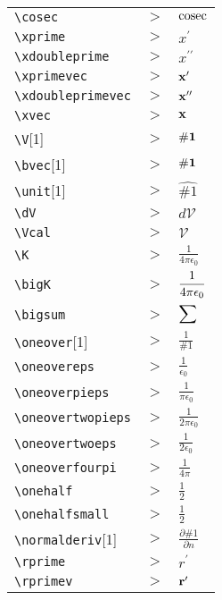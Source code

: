 
\begin{tabular}{l l l }
\verb|\cosec| &$\gt$& ${\hbox{cosec}}$\\[5pt] 
\verb|\xprime| &$\gt$& ${x^\prime}$\\[5pt] 
\verb|\xdoubleprime| &$\gt$& ${x^{\prime\prime}}$\\[5pt] 
\verb|\xprimevec| &$\gt$& ${{\bf{x}^\prime}}$\\[5pt] 
\verb|\xdoubleprimevec| &$\gt$& ${{\bf{x}^{\prime\prime}}}$\\[5pt] 
\verb|\xvec| &$\gt$& ${{\bf{x}}}$\\[5pt] 
\verb|\V|[1] &$\gt$& ${{\bf \#1}}$\\[5pt] 
\verb|\bvec|[1] &$\gt$& ${{\bf \#1}}$\\[5pt] 
\verb|\unit|[1] &$\gt$& ${\hat{\mathbf \#1}}$\\[5pt] 
\verb|\dV| &$\gt$& ${d\mathcal{V}}$\\[5pt] 
\verb|\Vcal| &$\gt$& ${\mathcal{V}}$\\[5pt] 
\verb|\K| &$\gt$& ${\frac{1}{4\pi \epsilon_0}}$\\[5pt] 
\verb|\bigK| &$\gt$& ${\mathlarger{\K}}$\\[5pt] 
\verb|\bigsum| &$\gt$& ${\mathlarger{\sum}}$\\[5pt] 
\verb|\oneover|[1] &$\gt$& ${\frac{1}{\#1}}$\\[5pt] 
\verb|\oneovereps| &$\gt$& ${\frac{1}{\epsilon_0}}$\\[5pt] 
\verb|\oneoverpieps| &$\gt$& ${\frac{1}{\pi\epsilon_0}}$\\[5pt] 
\verb|\oneovertwopieps| &$\gt$& ${\frac{1}{2\pi\epsilon_0}}$\\[5pt] 
\verb|\oneovertwoeps| &$\gt$& ${\frac{1}{2\epsilon_0}}$\\[5pt] 
\verb|\oneoverfourpi| &$\gt$& ${\frac{1}{4\pi}}$\\[5pt] 
\verb|\onehalf| &$\gt$& ${\frac{1}{2}}$\\[5pt] 
\verb|\onehalfsmall| &$\gt$& ${{\textstyle{\frac{1}{2}}}}$\\[5pt] 
\verb|\normalderiv|[1] &$\gt$& ${\frac{\partial \#1}{\partial n}}$\\[5pt] 
\verb|\rprime| &$\gt$& ${r^{\prime}}$\\[5pt] 
\verb|\rprimev| &$\gt$& ${{\bf r}^{\prime}}$\\[5pt] 
\end{tabular}

